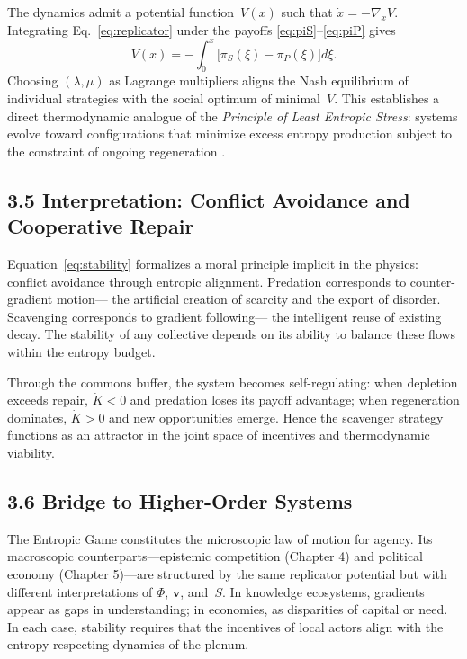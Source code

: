 \documentclass[11pt,a4paper,titlepage]{article}
\theoremstyle{definition}
\begin{document}
The dynamics admit a potential function~$V(x)$ such that
$\dot{x} = -\nabla_x V$.
Integrating Eq.~\eqref{eq:replicator} under the payoffs
\eqref{eq:piS}–\eqref{eq:piP} gives
\begin{equation}
V(x) =
 -\!\int_0^x\!
  \big[\pi_S(\xi) - \pi_P(\xi)\big] d\xi.
\label{eq:potential}
\end{equation}
Choosing $(\lambda,\mu)$ as Lagrange multipliers aligns the Nash equilibrium of
individual strategies with the social optimum of minimal~$V$.
This establishes a direct thermodynamic analogue of the
\emph{Principle of Least Entropic Stress}:
systems evolve toward configurations that minimize excess entropy production
subject to the constraint of ongoing regeneration
\cite{onsager1931,friston2010,friston2022}.

\subsection{3.5 Interpretation: Conflict Avoidance and Cooperative Repair}

Equation~\eqref{eq:stability} formalizes a moral principle implicit in the
physics: conflict avoidance through entropic alignment.
Predation corresponds to counter-gradient motion—
the artificial creation of scarcity and the export of disorder.
Scavenging corresponds to gradient following—
the intelligent reuse of existing decay.
The stability of any collective depends on its ability to balance these flows
within the entropy budget.

Through the commons buffer, the system becomes self-regulating:
when depletion exceeds repair, $\dot{K}<0$ and predation loses its payoff
advantage; when regeneration dominates, $\dot{K}>0$ and new opportunities
emerge.  Hence the scavenger strategy functions as an attractor in the joint
space of incentives and thermodynamic viability.

\subsection{3.6 Bridge to Higher-Order Systems}

The Entropic Game constitutes the microscopic law of motion for agency.
Its macroscopic counterparts—epistemic competition (Chapter 4) and political
economy (Chapter 5)—are structured by the same replicator potential but with
different interpretations of $\Phi$, $\mathbf{v}$, and~$S$.
In knowledge ecosystems, gradients appear as gaps in understanding;
in economies, as disparities of capital or need.
In each case, stability requires that the incentives of local actors align with
the entropy-respecting dynamics of the plenum.
\end{document}

